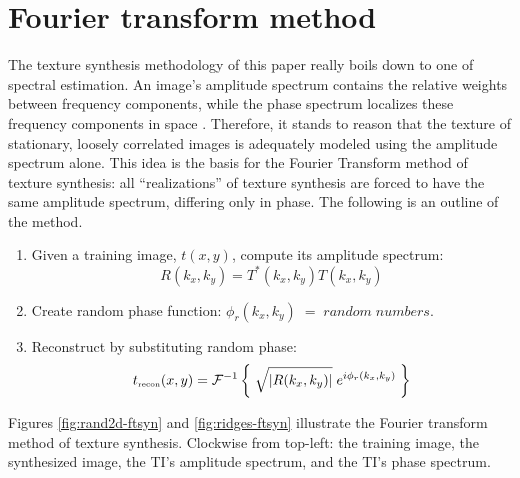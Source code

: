 \section{ Fourier transform method }

	The texture synthesis methodology of this paper really boils down to one of 
	spectral estimation.  An image's amplitude spectrum contains the relative weights 
	between frequency components, while the phase spectrum localizes these frequency 
	components in space {\small \cite{castleman}}.   Therefore, it stands to reason that 
	the texture 
	of stationary, loosely correlated images is adequately modeled using the amplitude 
	spectrum alone.  This idea is the basis for the Fourier Transform method of	texture 
	synthesis: all ``realizations'' of texture synthesis are forced to have the same 
	amplitude spectrum, differing only in phase.  The following is an outline of the
	method.

	\begin{enumerate}
		\item Given a training image, $t(x,y)$, compute its amplitude spectrum: 
			\begin{equation}
				R(k_x,k_y) = T^*(k_x,k_y) T(k_x,k_y)  \label{eq:amp-spec}
			\end{equation}
		\item Create random phase function:  $\phi_r(k_x,k_y) \;=\; random \; numbers$.
		\item Reconstruct by substituting random phase:  
			\begin{equation} t_{\tiny \mbox{recon}}(x,y) = 
          {\cal F}^{-1} \left\{ \; \sqrt{\left|R(k_x,k_y)\right|} \; e^{i \phi_r(k_x,k_y) } \; \right\}  \label{eq:ft-recon}
			\end{equation}
	\end{enumerate}

	Figures \ref{fig:rand2d-ftsyn} and \ref{fig:ridges-ftsyn}
	illustrate the Fourier transform method of texture synthesis.  Clockwise from 
	top-left: the training image, the synthesized image, the TI's amplitude spectrum, 
	and the TI's phase spectrum.  


